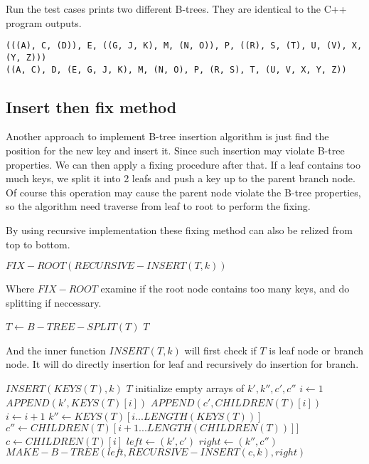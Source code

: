 \documentclass{article}
\begin{document}
Run the test cases prints two different B-trees. They are identical 
to the C++ program outputs.

\begin{verbatim}
(((A), C, (D)), E, ((G, J, K), M, (N, O)), P, ((R), S, (T), U, (V), X, (Y, Z)))
((A, C), D, (E, G, J, K), M, (N, O), P, (R, S), T, (U, V, X, Y, Z))
\end{verbatim}

\subsection{Insert then fix method}
Another approach to implement B-tree insertion algorithm is just find
the position for the new key and insert it. Since such insertion may
violate B-tree properties. We can then apply a fixing procedure after
that. If a leaf contains too much keys, we split it into 2 leafs and
push a key up to the parent branch node. Of course this operation
may cause the parent node violate the B-tree properties, so the 
algorithm need traverse from leaf to root to perform the fixing.

By using recursive implementation these fixing method can also be
relized from top to bottom.

\begin{algorithmic}[1]
  \State \Return $FIX-ROOT(RECURSIVE-INSERT(T, k))$
\EndFunction
\end{algorithmic}

Where $FIX-ROOT$ examine if the root node contains too many keys,
and do splitting if neccessary.

\begin{algorithmic}[1]
    \State $T \leftarrow B-TREE-SPLIT(T)$
  \EndIf
  \State \Return $T$
\EndFunction
\end{algorithmic}

And the inner function $INSERT(T, k)$ will first check if $T$ 
is leaf node or branch node. It will do directly insertion for leaf
and recursively do insertion for branch.

\begin{algorithmic}[1]
    \State $INSERT(KEYS(T), k)$
    \State \Return $T$
  \Else
    \State initialize empty arrays of $k', k'', c', c''$
    \State $i \leftarrow 1$
      \State $APPEND(k', KEYS(T)[i])$
      \State $APPEND(c', CHILDREN(T)[i])$
      \State $i \leftarrow i+1$
    \EndWhile
    \State $k'' \leftarrow KEYS(T)[i...LENGTH(KEYS(T))]$
    \State $c'' \leftarrow CHILDREN(T)[i+1...LENGTH(CHILDREN(T))]]$
    \State $c \leftarrow CHILDREN(T)[i]$
    \State $left \leftarrow (k', c')$
    \State $right \leftarrow (k'', c'')$
    \State \Return $MAKE-B-TREE(left, RECURSIVE-INSERT(c, k), right)$
  \EndIf
\EndFunction
\end{algorithmic}
\end{document}
